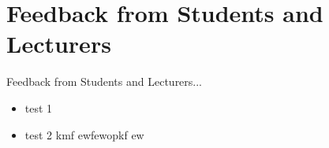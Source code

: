 \chapter{Feedback from Students and Lecturers}
\label{Feedback from Students and Lecturers}
Feedback from Students and Lecturers...
\begin{itemize}
	\item test 1
	\item test 2 kmf ewfewopkf ew
\end{itemize}
